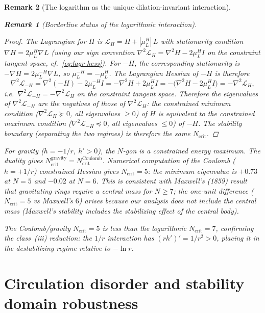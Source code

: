 \documentclass[12pt, a4paper]{article}
\newtheorem{remark}{Remark}[section]
\numberwithin{equation}{section}
\begin{document}
\begin{remark}[The logarithm as the unique dilation-invariant interaction]
\begin{remark}[Borderline status of the logarithmic interaction]
\begin{proof}
The Lagrangian for $H$ is $\mathcal{L}_H
= H + |\mu_L^H|\,L$ with stationarity condition
$\nabla H = 2\mu_L^H \nabla L$ (using our sign convention
$\nabla^2\mathcal{L}_H = \nabla^2 H - 2\mu_L^H I$ on the
constraint tangent space, cf.~\eqref{eq:lagr-hess}).
For $-H$, the corresponding stationarity is
$-\nabla H = 2\mu_L^{-H}\nabla L$, so $\mu_L^{-H} = -\mu_L^H$.
The Lagrangian Hessian of $-H$ is therefore
\[
  \nabla^2\mathcal{L}_{-H}
  = \nabla^2(-H) - 2\mu_L^{-H} I
  = -\nabla^2 H + 2\mu_L^H I
  = -\bigl(\nabla^2 H - 2\mu_L^H I\bigr)
  = -\nabla^2\mathcal{L}_H,
\]
i.e.\ $\nabla^2\mathcal{L}_{-H} = -\nabla^2\mathcal{L}_H$ on
the constraint tangent space.  Therefore the eigenvalues of
$\nabla^2\mathcal{L}_{-H}$ are the negatives of those of
$\nabla^2\mathcal{L}_H$: the constrained minimum
condition ($\nabla^2\mathcal{L}_H \succeq 0$, all eigenvalues
$\ge 0$) of $H$ is equivalent to the constrained maximum
condition ($\nabla^2\mathcal{L}_{-H} \preceq 0$, all eigenvalues
$\le 0$) of $-H$.  The stability boundary (separating the two
regimes) is therefore the same $N_{\mathrm{crit}}$.
\end{proof}

For gravity ($h = -1/r$, $h' > 0$), the $N$-gon is a constrained
energy maximum.  The duality gives
$N_{\mathrm{crit}}^{\mathrm{gravity}} =
N_{\mathrm{crit}}^{\mathrm{Coulomb}}$.  Numerical computation of
the Coulomb ($h = +1/r$) constrained Hessian gives
$N_{\mathrm{crit}} = 5$: the minimum eigenvalue is $+0.73$ at $N = 5$
and $-0.02$ at $N = 6$.  This is consistent with Maxwell's (1859)
result that gravitating rings require a central mass for
$N \ge 7$; the one-unit difference ($N_{\mathrm{crit}} = 5$ vs
Maxwell's $6$) arises because our analysis does not include the
central mass (Maxwell's stability includes the stabilizing effect
of the central body).

The Coulomb/gravity $N_{\mathrm{crit}} = 5$ is less than the
logarithmic $N_{\mathrm{crit}} = 7$, confirming the class~(iii)
reduction: the $1/r$ interaction has $(rh')' = 1/r^2 > 0$, placing
it in the destabilizing regime relative to $-\ln r$.



\section{Circulation disorder and stability domain robustness}
\label{sec:disorder-new}


\end{remark}
\end{remark}
\end{document}
